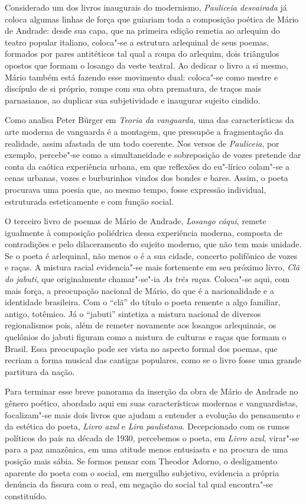 Considerado um dos livros inaugurais do modernismo, \emph{Pauliceia desvairada}
já coloca algumas linhas de força que guiariam toda a composição poética de Mário de Andrade: desde sua capa, que na primeira edição remetia ao arlequim do teatro popular italiano, coloca"-se a estrutura arlequinal de seus poemas, formados por pares antitéticos tal qual a roupa do arlequim, dois triângulos opostos que formam o losango da veste teatral. Ao dedicar o livro a si mesmo, Mário também está fazendo esse movimento dual: coloca"-se como mestre e discípulo de si próprio, rompe com sua obra prematura, de traços mais parnasianos, ao duplicar sua subjetividade e inaugurar sujeito cindido.

Como analisa Peter Bürger em \textit{Teoria da vanguarda}, uma das características da arte moderna de vanguarda é a montagem, que pressupõe a fragmentação da realidade, assim afastada de um todo coerente. Nos versos de \textit{Pauliceia}, por exemplo, percebe"-se como a simultaneidade e sobreposição de vozes pretende dar conta da caótica experiência urbana, em que reflexões do eu"-lírico colam"-se a cenas urbanas, vozes e burburinhos vindos dos bondes e bares.
Assim, o poeta procurava uma poesia que, ao mesmo tempo, fosse expressão individual, estruturada esteticamente e com função social.

O terceiro livro de poemas de Mário de Andrade, \textit{Losango cáqui}, remete igualmente à composição poliédrica dessa experiência moderna, composta de contradições e pelo dilaceramento do sujeito moderno, que não tem mais unidade.
Se o poeta é arlequinal, não menos o é a sua cidade, concerto polifônico de vozes e raças. A mistura racial evidencia"-se mais fortemente em seu próximo livro, \textit{Clã do jabuti}, que originalmente chamar"-se"-ia \textit{As três raças}.
Coloca"-se aqui, com mais força, a preocupação nacional de Mário, do que é a nacionalidade e a identidade brasileira. Com o ``clã'' do título o poeta remente a algo familiar, antigo, totêmico. Já o ``jabuti'' sintetiza a mistura nacional de diversos regionalismos pois, além de remeter novamente aos losangos arlequinais, os quelônios do jabuti figuram como a mistura de culturas e raças que formam o Brasil. Essa preocupação pode ser vista no aspecto formal dos poemas, que recriam a forma musical das cantigas populares, como se o livro fosse uma grande partitura da nação.

Para terminar esse breve panorama da inserção da obra de Mário de Andrade no gênero poético, abordado aqui em suas características modernas e vanguardistas, focalizam"-se mais dois livros que ajudam a entender a evolução do pensamento e da estética do poeta, \textit{Livro azul} e \textit{Lira paulistana}.
Decepcionado com os rumos políticos do país na década de 1930, percebemos o poeta, em \textit{Livro azul}, virar"-se para a paz amazônica, em uma atitude menos entusiasta e na procura de uma posição mais sábia. 
Se formos pensar com Theodor Adorno, o desligamento aparente do poeta com o social, em mergulho subjetivo, evidencia a própria denúncia da fissura com o real, em negação do social tal qual encontra"-se constituído.

